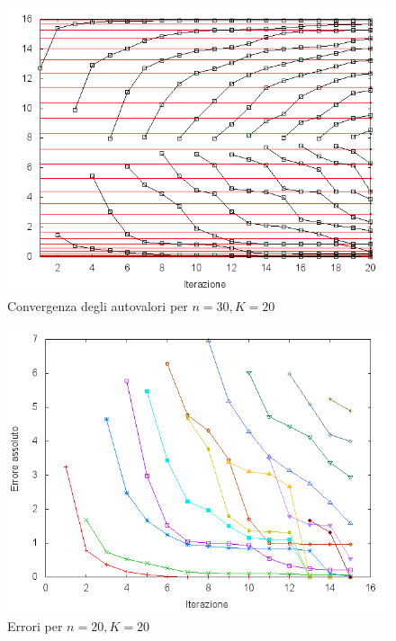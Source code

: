 \documentclass[11pt]{article}
\numberwithin{equation}{subsection}
\begin{document}
\begin{figure}[htb]
\centering
\includegraphics[scale=0.65]{img/eigv_n30K20.png}
\caption{Convergenza degli autovalori per $n = 30, K = 20$}
\end{figure}

\begin{figure}[htb]
\centering
\includegraphics[scale=0.65]{./img/errors_n20K20.png}
\caption{Errori per $n=20, K=20$}
\end{figure}
\end{document}
